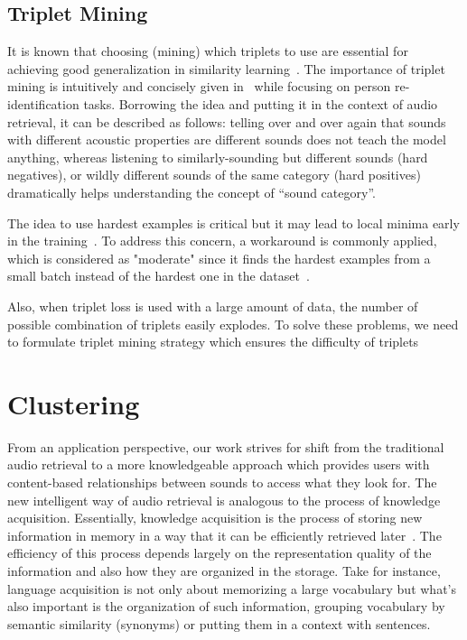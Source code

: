 \subsection{Triplet Mining}
It is known that choosing (mining) which triplets to use are essential for achieving good generalization in similarity learning~\cite{schroff2015}. The importance of triplet mining is intuitively and concisely given in~\cite{hermans2017} while focusing on person re-identification tasks. Borrowing the idea and putting it in the context of audio retrieval, it can be described as follows: telling over and over again that sounds with different acoustic properties are different sounds does not teach the model anything, whereas listening to similarly-sounding but different sounds (hard negatives), or wildly different sounds of the same category (hard positives) dramatically helps understanding the concept of “sound category”. 

The idea to use hardest examples is critical but it may lead to local minima early in the training~\cite{schroff2015}. To address this concern, a workaround is commonly applied, which is considered as "moderate" since it finds the hardest examples from a small batch instead of the hardest one in the dataset~\cite{hermans2017, yesiler2020}.

Also, when triplet loss is used with a large amount of data, the number of possible combination of triplets easily explodes. To solve these problems, we need to formulate triplet mining strategy which ensures the difficulty of triplets 

\section{Clustering}
From an application perspective, our work strives for shift from the traditional audio retrieval to a more knowledgeable approach which provides users with content-based relationships between sounds to access what they look for. The new intelligent way of audio retrieval is analogous to the process of knowledge acquisition. 
Essentially, knowledge acquisition is the process of storing new information in memory in a way that it can be efficiently retrieved later~\cite{danielle2002}. The efficiency of this process depends largely on the representation quality of the information and also how they are organized in the storage. Take for instance, language acquisition is not only about memorizing a large vocabulary but what's also important is the organization of such information, grouping vocabulary by semantic similarity (synonyms) or putting them in a context with sentences.

